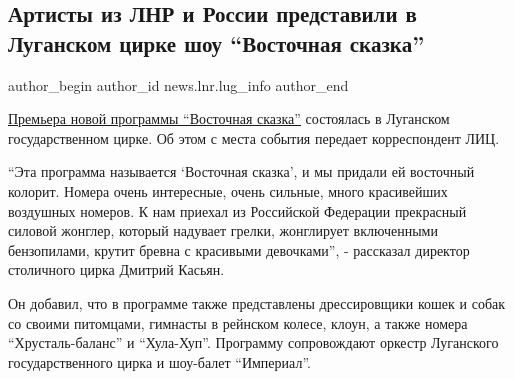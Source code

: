  
 
 
 
 
 
\subsection{Артисты из ЛНР и России представили в Луганском цирке шоу \enquote{Восточная сказка}}
\label{sec:12_02_2022.stz.news.lnr.lug_info.2.cirk_vostochnaja_skazka}
 
\ifcmt
 author_begin
   author_id news.lnr.lug_info
 author_end
\fi

\href{https://lug-info.com/news/luganskij-cirk-s-12-fevrala-priglasaet-zritelej-na-novuu-programmu-vostocnaa-skazka}{Премьера
новой программы \enquote{Восточная сказка}} состоялась в Луганском
государственном цирке. Об этом с места события передает корреспондент ЛИЦ.


\enquote{Эта программа называется \enquote{Восточная сказка}, и мы придали ей
восточный колорит. Номера очень интересные, очень сильные, много красивейших
воздушных номеров. К нам приехал из Российской Федерации прекрасный силовой
жонглер, который надувает грелки, жонглирует включенными бензопилами, крутит
бревна с красивыми девочками}, - рассказал директор столичного цирка Дмитрий
Касьян.


Он добавил, что в программе также представлены дрессировщики кошек и собак со
своими питомцами, гимнасты в рейнском колесе, клоун, а также номера
\enquote{Хрусталь-баланс} и \enquote{Хула-Хуп}. Программу сопровождают оркестр
Луганского государственного цирка и шоу-балет \enquote{Империал}.


